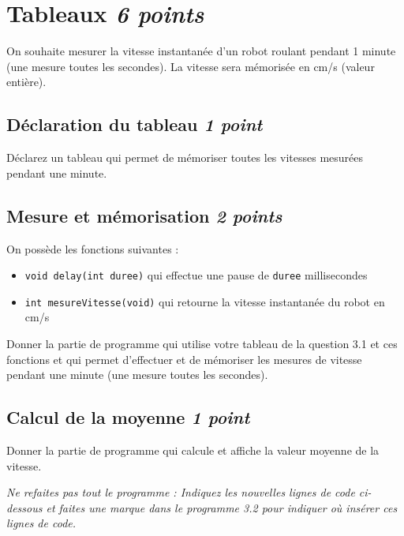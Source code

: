 
\section{Tableaux \hfill \textit{6 points}}

On souhaite mesurer la vitesse instantanée d'un robot roulant pendant 1 minute (une mesure toutes les secondes). La vitesse sera mémorisée en cm/s (valeur entière).

\vspace{0.5em}

\subsection{Déclaration du tableau \hfill \textit{1 point}}

\UPSTIquestion
Déclarez un tableau qui permet de mémoriser toutes les vitesses mesurées pendant une minute.

\espaceReponse{2cm}

\subsection{Mesure et mémorisation \hfill \textit{2 points}}

On possède les fonctions suivantes :
\begin{itemize}
    \item \texttt{void delay(int duree)} qui effectue une pause de \texttt{duree} millisecondes
    \item \texttt{int mesureVitesse(void)} qui retourne la vitesse instantanée du robot en cm/s
\end{itemize}

\UPSTIquestion
Donner la partie de programme qui utilise votre tableau de la question 3.1 et ces fonctions et qui permet d'effectuer et de mémoriser les mesures de vitesse pendant une minute (une mesure toutes les secondes).

\espaceReponse{5cm}

\subsection{Calcul de la moyenne \hfill \textit{1 point}}

\UPSTIquestion
Donner la partie de programme qui calcule et affiche la valeur moyenne de la vitesse.

\textit{Ne refaites pas tout le programme : Indiquez les nouvelles lignes de code ci-dessous et faites une marque dans le programme 3.2 pour indiquer où insérer ces lignes de code.}

